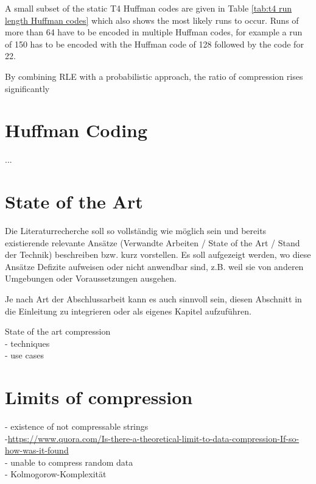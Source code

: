 \par{
A small subset of the static T4 Huffman codes are given in Table \ref{tab:t4 run length Huffman
	codes} which also shows the most likely runs to occur. Runs of more than 64 have to be encoded in multiple Huffman codes, for example a run of 150 has to be encoded with the Huffman code of 128 followed by the code for 22.
}

\par{
By combining RLE with a probabilistic approach, the ratio of compression rises significantly}
\section{Huffman Coding}
\label{ch:Principles of compression:sec:Huffman Coding}

...

\section{State of the Art}
\label{ch:Principles of compression:sec:SOTA}
Die Literaturrecherche soll so vollständig wie möglich sein und bereits existierende relevante Ansätze (Verwandte Arbeiten / State of the Art / Stand der Technik) beschreiben bzw. kurz vorstellen.
Es soll aufgezeigt werden, wo diese Ansätze Defizite aufweisen oder nicht anwendbar sind, z.B. weil sie von anderen Umgebungen oder Voraussetzungen ausgehen.

Je nach Art der Abschlussarbeit kann es auch sinnvoll sein, diesen Abschnitt in die Einleitung zu integrieren oder als eigenes Kapitel aufzuführen.



State of the art compression\\
- techniques\\
- use cases\\


\section{Limits of compression}
\label{ch:Principles of compression:sec:Limits of Conpression}

- existence of not compressable strings\\
-\url{https://www.quora.com/Is-there-a-theoretical-limit-to-data-compression-If-so-how-was-it-found} \\
- unable to compress random data\\
- Kolmogorow-Komplexität	

